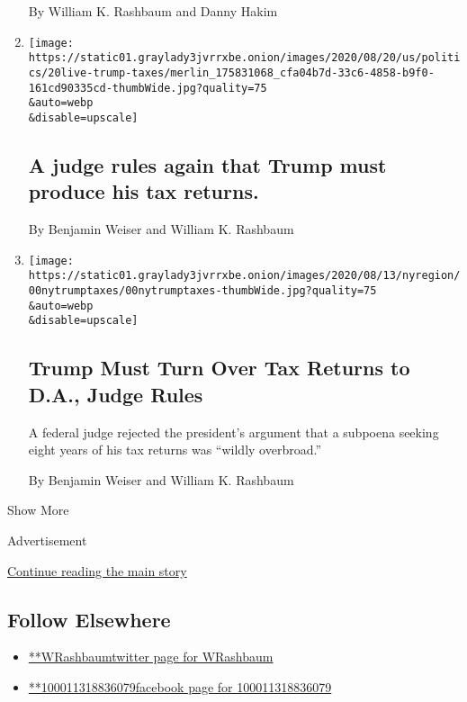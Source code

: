 \begin{enumerate}
  By William K. Rashbaum and Danny Hakim
\item
  \href{/2020/08/20/us/elections/a-judge-rules-again-that-trump-must-produce-his-tax-returns.html}{}

  \texttt{[image: https://static01.graylady3jvrrxbe.onion/images/2020/08/20/us/politics/20live-trump-taxes/merlin\_175831068\_cfa04b7d-33c6-4858-b9f0-161cd90335cd-thumbWide.jpg?quality=75\\\&auto=webp\\\&disable=upscale]}

  \hypertarget{a-judge-rules-again-that-trump-must-produce-his-tax-returns}{%
  \subsection{A judge rules again that Trump must produce his tax
  returns.}\label{a-judge-rules-again-that-trump-must-produce-his-tax-returns}}

  By Benjamin Weiser and William K. Rashbaum
\item
  \href{/2020/08/20/nyregion/donald-trump-taxes-cyrus-vance.html}{}

  \texttt{[image: https://static01.graylady3jvrrxbe.onion/images/2020/08/13/nyregion/00nytrumptaxes/00nytrumptaxes-thumbWide.jpg?quality=75\\\&auto=webp\\\&disable=upscale]}

  \hypertarget{trump-must-turn-over-tax-returns-to-da-judge-rules}{%
  \subsection{Trump Must Turn Over Tax Returns to D.A., Judge
  Rules}\label{trump-must-turn-over-tax-returns-to-da-judge-rules}}

  A federal judge rejected the president's argument that a subpoena
  seeking eight years of his tax returns was ``wildly overbroad.''

  By Benjamin Weiser and William K. Rashbaum
\end{enumerate}

Show More

Advertisement

\protect\hyperlink{after-mid2}{Continue reading the main story}

\hypertarget{follow-elsewhere}{%
\subsection{Follow Elsewhere}\label{follow-elsewhere}}

\begin{itemize}
\tightlist
\item
  \href{https://twitter.com/WRashbaum}{**WRashbaumtwitter page for
  WRashbaum}
\item
  \href{https://www.facebookcorewwwi.onion/100011318836079}{**100011318836079facebook
  page for 100011318836079}
\end{itemize}

